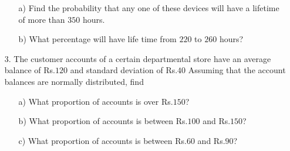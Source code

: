 \documentclass[a4paper,10pt,openright]{report}
\begin{document}
\begin{enumerate}
\begin{enumerate}

\item[a)] Find the probability that any one of these devices will have a lifetime of more
than $350$ hours.
\item[b)] What percentage will have life time from $220$ to $260$ hours?

\end{enumerate}

\item[3.] The customer accounts of a certain departmental store have an average balance of
Rs.$120$ and standard deviation of Rs.$40$ Assuming that the account balances are normally
distributed, find

\begin{enumerate}

\item[a)] What proportion of accounts is over Rs.$150$?
\item[b)] What proportion of accounts is between Rs.$100$ and Rs.$150$?
\item[c)] What proportion of accounts is between Rs.$60$ and Rs.$90$?

\end{enumerate}

\end{enumerate}
\end{document}
